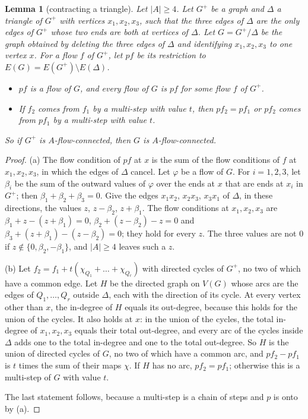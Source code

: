 \documentclass[11pt]{article}
\newtheorem{lemma}[theorem]{Lemma}
\theoremstyle{definition}
\begin{document}
\begin{lemma}[contracting a triangle]\label{lem:triangle}
Let $|A|\ge 4$. Let $G^+$ be a graph and $\Delta$ a triangle of $G^+$ with vertices $x_1,x_2,x_3$, such that the
three edges of $\Delta$ are the only edges of $G^+$ whose two ends are both at vertices of $\Delta$. Let $G=G^+/\Delta$ be the
graph obtained by deleting the three edges of $\Delta$ and identifying $x_1,x_2,x_3$ to one vertex $x$. For a flow
$f$ of $G^+$, let $pf$ be its restriction to $E(G)=E(G^+)\setminus E(\Delta)$.
\begin{itemize}
\item[(a)] $pf$ is a flow of $G$, and every flow of $G$ is $pf$ for some flow $f$ of $G^+$.
\item[(b)] If $f_2$ comes from $f_1$ by a multi-step with value $t$, then $pf_2=pf_1$ or $pf_2$ comes from $pf_1$
by a multi-step with value $t$.
\end{itemize}
So if $G^+$ is $A$-flow-connected, then $G$ is $A$-flow-connected.
\end{lemma}
\begin{proof}
(a) The flow condition of $pf$ at $x$ is the sum of the flow conditions of $f$ at $x_1,x_2,x_3$, in which the edges
of $\Delta$ cancel. Let $\varphi$ be a flow of $G$. For $i=1,2,3$, let $\beta_i$ be the sum of the outward values of $\varphi$
over the ends at $x$ that are ends at $x_i$ in $G^+$; then $\beta_1+\beta_2+\beta_3=0$. Give the edges $x_1x_2$,
$x_2x_3$, $x_3x_1$ of $\Delta$, in these directions, the values $z$, $z-\beta_2$, $z+\beta_1$. The flow conditions at
$x_1,x_2,x_3$ are $\beta_1+z-(z+\beta_1)=0$, $\beta_2+(z-\beta_2)-z=0$ and $\beta_3+(z+\beta_1)-(z-\beta_2)=0$; they
hold for every $z$. The three values are not $0$ if $z\notin\{0,\beta_2,-\beta_1\}$, and $|A|\ge 4$ leaves such a
$z$.

(b) Let $f_2=f_1+t(\chi_{Q_1}+\dots+\chi_{Q_r})$ with directed cycles of $G^+$, no two of which have a common edge.
Let $H$ be the directed graph on $V(G)$ whose arcs are the edges of $Q_1,\dots,Q_r$ outside $\Delta$, each with the
direction of its cycle. At every vertex other than $x$, the in-degree of $H$ equals its out-degree, because this holds for the union of the
cycles. It also holds at $x$: in the union of the cycles, the total in-degree of $x_1,x_2,x_3$ equals their total
out-degree, and every arc of the cycles inside $\Delta$ adds one to the total in-degree and one to the total out-degree. So $H$ is the union of
directed cycles of $G$, no two of which have a common arc, and $pf_2-pf_1$ is $t$ times the sum of their maps $\chi$.
If $H$ has no arc, $pf_2=pf_1$; otherwise this is a multi-step of $G$ with value $t$.

The last statement follows, because a multi-step is a chain of steps and $p$ is onto by (a).
\end{proof}
\end{document}
